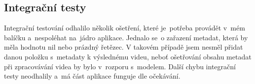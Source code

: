 \subsection{Integrační testy}
\par Integrační testování odhalilo několik ošetření, které je~potřeba provádět v~mém balíčku a~nespoléhat na~jádro aplikace. Jednalo se~o zařazení metadat, která by měla hodnotu nil nebo prázdný řetězec. V takovém případě jsem nesměl přidat danou položku s~metadaty k výslednému videu, neboť ošetřování obsahu metadat při zpracovávání videa by bylo v~rozporu s~modelem. Další chybu integrační testy neodhalily a~má část aplikace funguje dle očekávání.